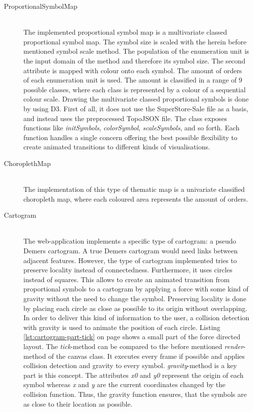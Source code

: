 \begin{description}
\begin{lstlisting}[language=JavaScript, caption={Particles on a dot map getting animated.}, label={lst:dot-draw-animated}]
\end{lstlisting}

\item[ProportionalSymbolMap] \hfill \\
The implemented proportional symbol map is a multivariate classed proportional symbol map. The symbol size is scaled with the herein before mentioned symbol scale method. The population of the enumeration unit is the input domain of the method and therefore its symbol size. The second attribute is mapped with colour onto each symbol. The amount of orders of each enumeration unit is used. The amount is classified in a range of $9$ possible classes, where each class is represented by a colour of a sequential colour scale.
Drawing the multivariate classed proportional symbols is done by using \ac{D3}. First of all, it does not use the SuperStore-Sale file as a basis, and instead uses the preprocessed TopoJSON file. The class exposes functions like \textit{initSymbols}, \textit{colorSymbol}, \textit{scaleSymbols}, and so forth. Each function handles a single concern offering the best possible flexibility to create animated transitions to different kinds of visualisations.

\item[ChoroplethMap] \hfill \\
The implementation of this type of thematic map is a univariate classified choropleth map, where each coloured area represents the amount of orders.

\item[Cartogram] \hfill \\
The web-application implements a specific type of cartogram: a pseudo Demers cartogram. A true Demers cartogram would need links between adjacent features. However, the type of cartogram implemented tries to preserve locality instead of connectedness. Furthermore, it uses circles instead of squares. This allows to create an animated transition from proportional symbols to a cartogram by applying a force with some kind of gravity without the need to change the symbol.
Preserving locality is done by placing each circle as close as possible to its origin without overlapping. In order to deliver this kind of information to the user, a collision detection with gravity is used to animate the position of each circle. Listing \ref{lst:cartogram-part-tick} on page \pageref{lst:cartogram-part-tick} shows a small part of the force directed layout. The \textit{tick}-method can be compared to the before mentioned \textit{render}-method of the canvas class. It executes every frame if possible and applies collision detection and gravity to every symbol. \textit{gravity}-method is a key part is this concept. The attributes \textit{x0} and \textit{y0} represent the origin of each symbol whereas \textit{x} and \textit{y} are the current coordinates changed by the collision function. Thus, the gravity function ensures, that the symbols are as close to their location as possible.


\end{description}

